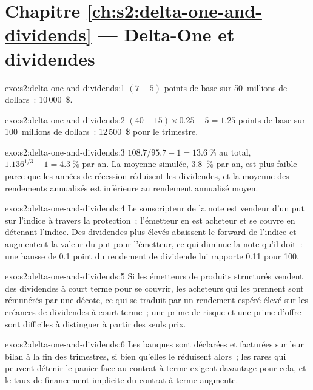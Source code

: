 \section*{Chapitre \ref{ch:s2:delta-one-and-dividends} --- Delta-One et dividendes}

\begin{solution}{exo:s2:delta-one-and-dividends:1}
$(7 - 5)$ points de base sur 50~millions de dollars~: 10\,000~\$.
\end{solution}

\begin{solution}{exo:s2:delta-one-and-dividends:2}
$(40 - 15) \times 0.25 - 5 = 1.25$ points de base sur 100~millions de dollars~: 12\,500~\$ pour le trimestre.
\end{solution}

\begin{solution}{exo:s2:delta-one-and-dividends:3}
$108.7 / 95.7 - 1 = 13.6~\%$ au total, $1.136^{1/3} - 1 = 4.3~\%$ par an. La moyenne simulée, 3.8~\% par an, est plus faible parce que les années de récession réduisent
les dividendes, et la moyenne des rendements annualisés est inférieure au rendement annualisé moyen.
\end{solution}

\begin{solution}{exo:s2:delta-one-and-dividends:4}
Le souscripteur de la note est vendeur d'un put sur l'indice à travers la protection~; l'émetteur en est acheteur et se couvre en détenant l'indice. Des dividendes plus élevés abaissent le
forward de l'indice et augmentent la valeur du put pour l'émetteur, ce qui diminue la note qu'il doit~: une hausse de 0.1 point du rendement de dividende lui rapporte 0.11 pour 100.
\end{solution}

\begin{solution}{exo:s2:delta-one-and-dividends:5}
Si les émetteurs de produits structurés vendent des dividendes à court terme pour se couvrir, les acheteurs qui les prennent sont rémunérés par une décote, ce qui se traduit par un rendement espéré élevé
sur les créances de dividendes à court terme~; une prime de risque et une prime d'offre sont difficiles à distinguer à partir des seuls prix.
\end{solution}

\begin{solution}{exo:s2:delta-one-and-dividends:6}
Les banques sont déclarées et facturées sur leur bilan à la fin des trimestres, si bien qu'elles le réduisent alors~; les rares qui peuvent détenir le panier face au contrat à terme
exigent davantage pour cela, et le taux de financement implicite du contrat à terme augmente.
\end{solution}

